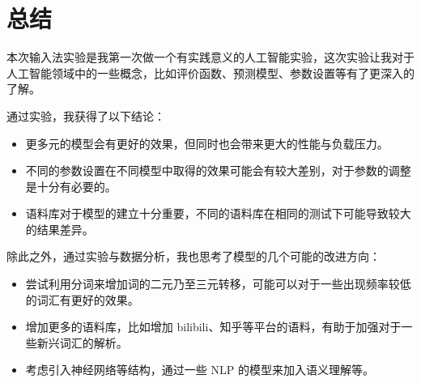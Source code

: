 \documentclass[a4paper]{article}
\begin{document}
    \section{总结}

    本次输入法实验是我第一次做一个有实践意义的人工智能实验，这次实验让我对于人工智能领域中的一些概念，比如评价函数、预测模型、参数设置等有了更深入的了解。

    通过实验，我获得了以下结论：

    \begin{itemize}
        \item 更多元的模型会有更好的效果，但同时也会带来更大的性能与负载压力。
        \item 不同的参数设置在不同模型中取得的效果可能会有较大差别，对于参数的调整是十分有必要的。
        \item 语料库对于模型的建立十分重要，不同的语料库在相同的测试下可能导致较大的结果差异。
    \end{itemize}

    除此之外，通过实验与数据分析，我也思考了模型的几个可能的改进方向：

    \begin{itemize}
        \item 尝试利用分词来增加词的二元乃至三元转移，可能可以对于一些出现频率较低的词汇有更好的效果。
        \item 增加更多的语料库，比如增加 bilibili、知乎等平台的语料，有助于加强对于一些新兴词汇的解析。
        \item 考虑引入神经网络等结构，通过一些 NLP 的模型来加入语义理解等。
    \end{itemize}
\end{document}
